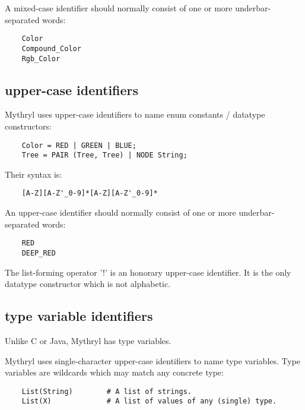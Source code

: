 A mixed-case identifier should normally consist of 
one or more underbar-separated words:

\begin{verbatim}
    Color
    Compound_Color
    Rgb_Color
\end{verbatim}

\cutend*

\subsection{upper-case identifiers}
\label{section:ref:identifiers:upper-case}

Mythryl uses upper-case identifiers to name 
enum constants / datatype constructors:

\begin{verbatim}
    Color = RED | GREEN | BLUE;
    Tree = PAIR (Tree, Tree) | NODE String;
\end{verbatim}

Their syntax is:

\begin{verbatim}
    [A-Z][A-Z'_0-9]*[A-Z][A-Z'_0-9]*
\end{verbatim}

An upper-case identifier should normally consist of 
one or more underbar-separated words:

\begin{verbatim}
    RED
    DEEP_RED
\end{verbatim}

The list-forming operator '!' is an honorary upper-case identifier. 
It is the only datatype constructor which is not alphabetic.

\cutend*

\subsection{type variable identifiers}
\label{section:ref:identifiers:type-variable}

Unlike C or Java, Mythryl has type variables.

Mythryl uses single-character upper-case identifiers to name 
type variables.  Type variables are wildcards which may 
match any concrete type:

\begin{verbatim}
    List(String)        # A list of strings.
    List(X)             # A list of values of any (single) type.
\end{verbatim}


